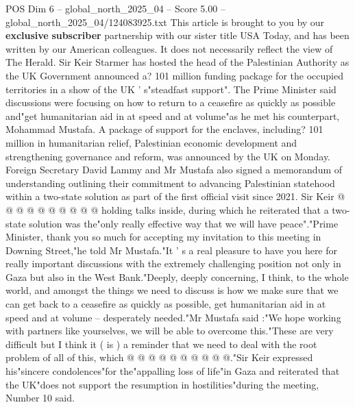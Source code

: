 \begin{textsample}{POS Dim 6 – global\_north\_2025\_04 – Score 5.00 – global\_north\_2025\_04/124083925.txt}  \label{ex:f6_pos_196}
This article is brought to you by our \textbf{exclusive} \textbf{subscriber} partnership with our sister title USA Today, and has been written by our American colleagues.
It does not necessarily reflect the view of The Herald.
Sir Keir Starmer has hosted the head of the Palestinian Authority as the UK Government announced a? 101 million funding package for the occupied territories in a show of the UK ' s"steadfast support".
The Prime Minister said discussions were focusing on how to return to a ceasefire as quickly as possible and"get humanitarian aid in at speed and at volume"as he met his counterpart, Mohammad Mustafa.
A package of support for the enclaves, including? 101 million in humanitarian relief, Palestinian economic development and strengthening governance and reform, was announced by the UK on Monday.
Foreign Secretary David Lammy and Mr Mustafa also signed a memorandum of understanding outlining their commitment to advancing Palestinian statehood within a two-state solution as part of the first official visit since 2021.
Sir Keir @ @ @ @ @ @ @ @ @ @ holding talks inside, during which he reiterated that a two-state solution was the"only really effective way that we will have peace"."Prime Minister, thank you so much for accepting my invitation to this meeting in Downing Street,"he told Mr Mustafa."It ' s a real pleasure to have you here for really important discussions with the extremely challenging position not only in Gaza but also in the West Bank."Deeply, deeply concerning, I think, to the whole world, and amongst the things we need to discuss is how we make sure that we can get back to a ceasefire as quickly as possible, get humanitarian aid in at speed and at volume -- desperately needed."Mr Mustafa said :"We hope working with partners like yourselves, we will be able to overcome this."These are very difficult but I think it ( is ) a reminder that we need to deal with the root problem of all of this, which @ @ @ @ @ @ @ @ @ @."Sir Keir expressed his"sincere condolences"for the"appalling loss of life"in Gaza and reiterated that the UK"does not support the resumption in hostilities"during the meeting, Number 10 said.

\end{textsample}

